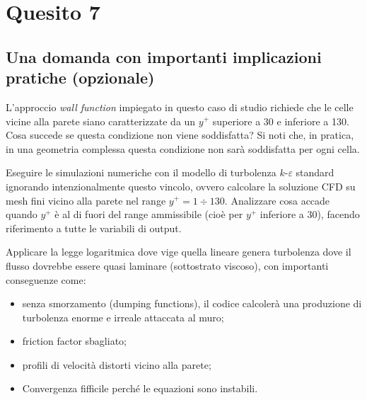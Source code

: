 
\section{Quesito 7}

\subsection*{Una domanda con importanti implicazioni pratiche (opzionale)}

\vspace{0.5em}

L'approccio \emph{wall function} impiegato in questo caso di studio richiede che le celle vicine alla parete siano caratterizzate da un $y^+$ superiore a 30 e inferiore a 130. Cosa succede se questa condizione non viene soddisfatta? Si noti che, in pratica, in una geometria complessa questa condizione non sarà soddisfatta per ogni cella.

Eseguire le simulazioni numeriche con il modello di turbolenza $k$-$\varepsilon$ standard ignorando intenzionalmente questo vincolo, ovvero calcolare la soluzione CFD su mesh fini vicino alla parete nel range $y^+ = 1 \div 130$. Analizzare cosa accade quando $y^+$ è al di fuori del range ammissibile (cioè per $y^+$ inferiore a 30), facendo riferimento a tutte le variabili di output.

\NotionDivider

Applicare la legge logaritmica dove vige quella lineare genera turbolenza dove il flusso dovrebbe essere quasi laminare (sottostrato viscoso), con importanti conseguenze come:
\begin{itemize}
    \item senza smorzamento (dumping functions), il codice calcolerà una produzione di turbolenza enorme e irreale attaccata al muro;
    \item friction factor sbagliato;
    \item profili di velocità distorti vicino alla parete;
    \item Convergenza fifficile perché le equazioni sono instabili.
\end{itemize}